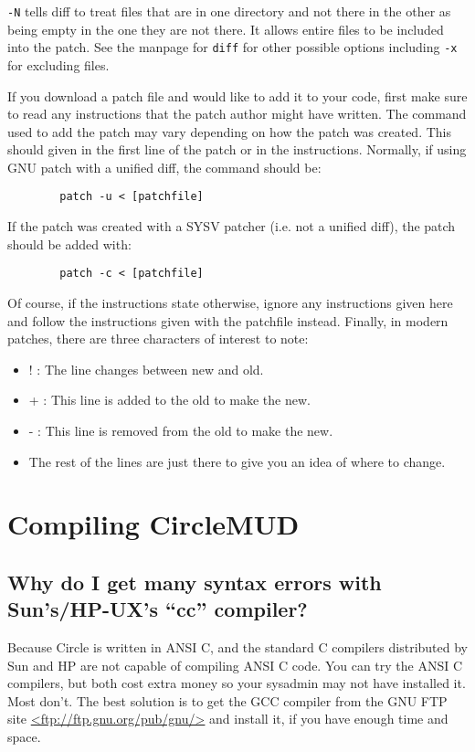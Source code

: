 \documentclass[11pt]{article}
\begin{document}
\texttt{-N} tells diff to treat files that are in one directory and not there in the other as being empty in the one they are not there.  It allows entire files to be included into the patch.\newline
See the manpage for \texttt{diff} for other possible options including \texttt{-x} for excluding files.
\par
If you download a patch file and would like to add it to your code, first make sure to read any instructions that the patch author might have written.  The command used to add the patch may vary depending on how the patch was created. This should given in the first line of the patch or in the instructions.  Normally, if using GNU patch with a unified diff, the command should be:
\begin{verbatim}
        patch -u < [patchfile]
\end{verbatim}
If the patch was created with a SYSV patcher (i.e. not a unified diff), the patch should be added with:
\begin{verbatim}
        patch -c < [patchfile]
\end{verbatim}
Of course, if the instructions state otherwise, ignore any instructions given here and follow the instructions given with the patchfile instead.\newline
Finally, in modern patches, there are three characters of interest to note:
\begin{itemize}
\item ! : The line changes between new and old.
\item + : This line is added to the old to make the new.
\item - : This line is removed from the old to make the new.
\item The rest of the lines are just there to give you an idea of where to change.
\end{itemize}

\section{Compiling CircleMUD}
\subsection{Why do I get many syntax errors with Sun's/HP-UX's ``cc'' compiler?}
Because Circle is written in ANSI C, and the standard C compilers distributed by Sun and HP are not capable of compiling ANSI C code.  You can try the ANSI C compilers, but both cost extra money so your sysadmin may not have installed it.  Most don't.  The best solution is to get the GCC compiler from the GNU FTP site \url{<ftp://ftp.gnu.org/pub/gnu/>} and install it, if you have enough time and space.
\end{document}
